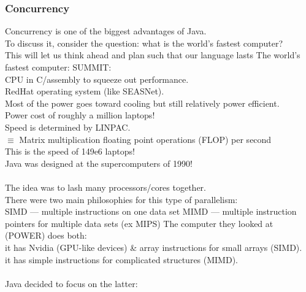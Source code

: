 \documentclass[../../lecture_notes.tex]{subfiles}
\begin{document}
\subsubsection*{Concurrency}
Concurrency is one of the biggest advantages of Java.\\
To discuss it, consider the question: what is the world’s fastest computer?\\
\indent This will let us think ahead and plan such that our language lasts
The world’s fastest computer: SUMMIT:\\
	\indent CPU in C/assembly to squeeze out performance.\\
	\indent RedHat operating system (like SEASNet).\\
	\indent Most of the power goes toward cooling but still relatively power efficient.\\
	\indent Power cost of roughly a million laptops!\\
	\indent Speed is determined by LINPAC.\\
		\indent \indent $\equiv$ Matrix multiplication floating point operations (FLOP) per second\\
	\indent This is the speed of 149e6 laptops!\\
Java was designed at the supercomputers of 1990!\\
\\
The idea was to lash many processors/cores together.\\
There were two main philosophies for this type of parallelism:\\
	\indent SIMD — multiple instructions on one data set
	\indent MIMD — multiple instruction pointers for multiple data sets (ex MIPS)
The computer they looked at (POWER) does both:\\
	\indent it has Nvidia (GPU-like devices) \& array instructions for small arrays (SIMD).\\
	\indent it has simple instructions for complicated structures (MIMD).\\
\\
Java decided to focus on the latter:
\end{document}
